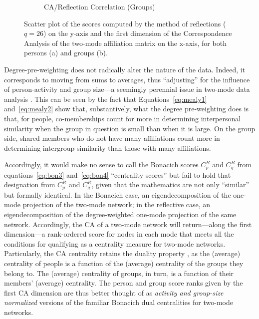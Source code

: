 \documentclass[a4paper,fleqn]{cas-sc}
\begin{document}
\begin{figure}
\begin{subfigure}[b]{0.45\textwidth}
            \caption{CA/Reflection Correlation (Groups)}
            \label{fig:g-ca-ref}
    \end{subfigure}
    \caption{Scatter plot of the scores computed by the method of reflections ($q = 26$) on the y-axis and the first dimension of the Correspondence Analysis of the two-mode affiliation matrix on the x-axis, for both persons (a) and groups (b). }
    \label{fig:ca-ref-corr}
\end{figure}

Degree-pre-weighting does not radically alter the nature of the data. Indeed, it corresponds to moving from sums to averages, thus ``adjusting'' for the influence of person-activity and group size---a seemingly perennial issue in two-mode data analysis \citep[159ff]{bonacich1991simultaneous}. This can be seen by the fact that Equations~\ref{eq:mealy1} and~\ref{eq:mealy2} show that, substantively, what the degree pre-weighting does is that, for people, co-memberships count for more in determining interpersonal similarity when the group in question is small than when it is large. On the group side, shared members who do not have many affiliations count more in determining intergroup similarity than those with many affiliations. 

Accordingly, it would make no sense to call the Bonacich scores $C^B_p$ and $C^B_g$ from equations~\ref{eq:bon3} and~\ref{eq:bon4} ``centrality scores'' but fail to hold that designation from $C^R_p$ and $C^R_g$, given that the mathematics are not only ``similar'' \citep[162]{bonacich1991simultaneous} but formally identical. In the Bonacich case, an eigendecomposition of the one-mode projection of the two-mode network; in the reflective case, an eigendecomposition of the degree-weighted one-mode projection of the same network. Accordingly, the CA of a two-mode network will return---along the first dimension---a rank-ordered score for nodes in each mode that meets all the conditions for qualifying as a centrality measure for two-mode networks. Particularly, the CA centrality retains the duality property \citep[128]{faust2005using}, as the (average) centrality of people is a function of the (average) centrality of the groups they belong to. The (average) centrality of groups, in turn, is a function of their members' (average) centrality. The person and group score ranks given by the first CA dimension are thus better thought of as \textit{activity and group-size normalized} versions of the familiar Bonacich \citeyearpar{bonacich1991simultaneous} dual centralities for two-mode networks.
\end{document}

